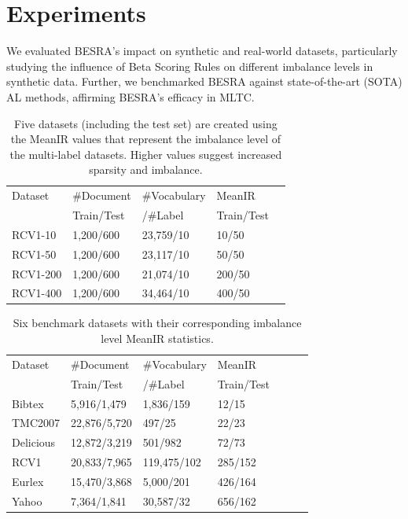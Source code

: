 \documentclass[letterpaper]{article} %
\begin{document}
\section{Experiments}
\label{sec:experiment}

We evaluated BESRA's impact on synthetic and real-world datasets, particularly studying the influence of Beta Scoring Rules on different imbalance levels in synthetic data. Further, we benchmarked BESRA against state-of-the-art (SOTA) AL methods, affirming BESRA's efficacy in MLTC.


\begin{table}[!t]
\centering
\begin{tabular}{lllll}
\toprule
Dataset     & \#Document   & \#Vocabulary  & MeanIR \\
& Train/Test   & /\#Label  & Train/Test \\
\midrule
RCV1-10     & 1,200/600 & 23,759/10  & 10/50 \\
RCV1-50      & 1,200/600 & 23,117/10  & 50/50\\
RCV1-200      & 1,200/600 & 21,074/10  & 200/50 \\
RCV1-400      & 1,200/600 & 34,464/10 & 400/50 \\
\bottomrule
\end{tabular}
\caption{Five datasets (including the test set) are created using the MeanIR values that represent the imbalance level of the multi-label datasets. Higher values suggest increased sparsity and imbalance.}
\label{tab:syndataset-table}
\end{table}
\begin{table}[!tb]
\centering
\begin{tabular}{lllllll}
\toprule

Dataset     & \#Document   & \#Vocabulary    & MeanIR \\
& Train/Test   & /\#Label & Train/Test \\
\midrule
Bibtex     & 5,916/1,479 & 1,836/159  & 12/15 \\
TMC2007   & 22,876/5,720 & 497/25  & 22/23 \\
Delicious     & 12,872/3,219 & 501/982  & 72/73 \\
RCV1     & 20,833/7,965 & 119,475/102  & 285/152 \\
Eurlex  & 15,470/3,868 & 5,000/201  &  426/164 \\
Yahoo   & 7,364/1,841 & 30,587/32  & 656/162 \\

\bottomrule
\end{tabular}
\caption{Six benchmark datasets with their corresponding imbalance level MeanIR statistics. }
\label{tab:dataset-table}
\end{table}
\end{document}
